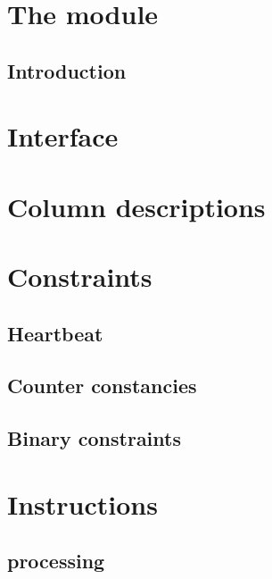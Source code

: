 
\section{The \rlpUtilsMod{} module}
\subsection{Introduction}                    \label{rlp utils: introduction}                          

\section{Interface}			                   \label{rlp utils: rlp* / rlp utils interface}          

\section{Column descriptions}                \label{rlp utils: column descriptions}                   

\section{Constraints}                        \label{rlp utils: constraints}
\subsection{Heartbeat}                       \label{rlp utils: constraints: heartbeat}                
\subsection{Counter constancies}             \label{rlp utils: constraints: constancies}              
\subsection{Binary constraints}              \label{rlp utils: constraints: binarities}               

\section{Instructions}                       \label{rlp utils: instructions}
\subsection{ processing}       \label{rlp utils: instructions: integer processing}      
